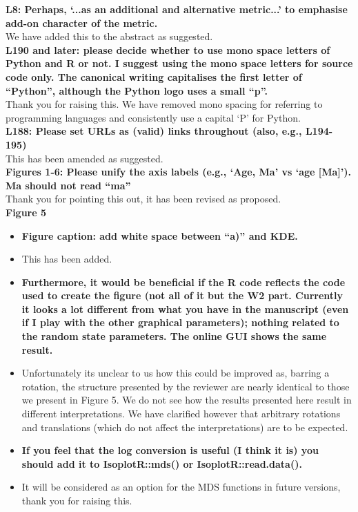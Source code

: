 \documentclass{article}[12p,a4paper]
\begin{document}
\textbf{L8: Perhaps, `...as an additional and alternative metric...' to emphasise add-on character of the metric.}\\

We have added this to the abstract as suggested.\\

\textbf{L190 and later: please decide whether to use mono space letters of Python and R or not. I suggest using the mono space letters for source code only. The canonical writing capitalises the first letter of “Python”, although the Python logo uses a small “p”.}\\ 

Thank you for raising this. We have removed mono spacing for referring to programming languages and consistently use a capital `P' for Python.\\ 

\textbf{L188: Please set URLs as (valid) links throughout (also, e.g., L194-195)}\\

This has been amended as suggested.\\

\textbf{Figures 1-6: Please unify the axis labels (e.g., `Age, Ma' vs `age [Ma]'). Ma should not read ``ma''}\\

Thank you for pointing this out, it has been revised as proposed.\\

\textbf{Figure 5
}\begin{itemize}
    \item \textbf{Figure caption: add white space between “a)” and KDE.} 
    \item This has been added.
    \item \textbf{Furthermore, it would be beneficial if the R code reflects the code used to create the figure (not all of it but the W2 part. Currently it looks a lot different from what you have in the manuscript (even if I play with the other graphical parameters); nothing related to the random state parameters. The online GUI shows the same result. }
    \item Unfortunately its unclear to us how this could be improved as, barring a rotation, the structure presented by the reviewer are nearly identical to those we present in Figure 5. We do not see how the results presented here result in different interpretations. We have clarified however that arbitrary rotations and translations (which do not affect the interpretations) are to be expected. 
    \item \textbf{If you feel that the log conversion is useful (I think it is) you should add it to IsoplotR::mds() or IsoplotR::read.data().} 
    \item It will be considered as an option for the MDS functions in future versions, thank you for raising this.
\end{itemize}
    
\end{document}

